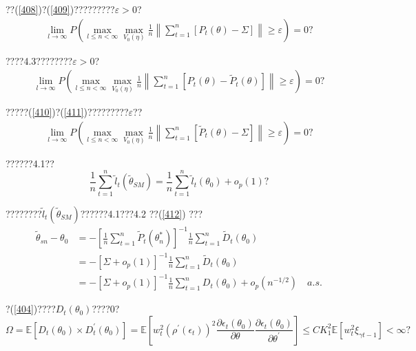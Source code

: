 \documentclass[a4paper,12pt,openany,oneside,utf-8]{ctexbook}
\begin{document}
	\noindent ??(\ref{408})?(\ref{409})?????????$\varepsilon>0$?
	\begin{align}\label{410}
		\lim _{l \rightarrow \infty} P\left(\max _{l \leq n<\infty} \max _{V_{0}(\eta)} \frac{1}{n}\left\|\sum_{t=1}^{n}\left[P_{t}(\theta)-\Sigma\right]\right\| \geq \varepsilon\right)=0\mbox{?}
	\end{align}
	
	\noindent ????4.3????????$\varepsilon>0$?
	\begin{align}\label{411}
		\lim _{l \rightarrow \infty} P\left(\max _{l \leq n<\infty} \max _{V_{0}(\eta)} \frac{1}{n}\left\|\sum_{t=1}^{n}\left[P_{t}(\theta)-\tilde{P}_{t}(\theta)\right]\right\| \geq \varepsilon\right)=0\mbox{?}
	\end{align}
	
	\noindent ?????(\ref{410})?(\ref{411})?????????$\varepsilon$??
	\begin{align}\label{412}
		\lim _{l \rightarrow \infty} P\left(\max _{l \leq n<\infty} \max _{V_{0}(\eta)} \frac{1}{n}\left\|\sum_{t=1}^{n}\left[\tilde{P}_{t}(\theta)-\Sigma\right]\right\| \geq \varepsilon\right)=0\mbox{?}
	\end{align}
	
	\noindent ??????4.1??
	$$\frac{1}{n}\sum_{t=1}^n\widetilde{l}_t(\tilde{\theta}_{SM})=\frac{1}{n}\sum_{t=1}^n\widetilde{l}_t(\theta_0)+o_p(1)\mbox{?}$$
	
	\noindent ????????$\widetilde{l}_t(\tilde{\theta}_{SM})$??????4.1???4.2 ??(\ref{412}) ???
	\begin{align}\label{413}
		\tilde{\theta}_{sn}-\theta_{0}&=-\left[\frac{1}{n} \sum_{t=1}^{n} \tilde{P}_{t}\left(\theta_{n}^{*}\right)\right]^{-1} \frac{1}{n} \sum_{t=1}^{n} \tilde{D}_{t}\left(\theta_{0}\right)\nonumber \\
		&=-[\Sigma+o_p(1)]^{-1} \frac{1}{n} \sum_{t=1}^{n} \tilde{D}_{t}\left(\theta_{0}\right)\nonumber \\
		&=-[\Sigma+o_p(1)]^{-1} \frac{1}{n} \sum_{t=1}^{n} D_{t}\left(\theta_{0}\right)+o_p\left(n^{-1 / 2}\right) \quad a.s.
	\end{align}
	
	\noindent ?(\ref{404})????$D_{t}(\theta_0)$????0?
	$$\Omega \!=\! \mathbb{E}\left[D_t(\theta_0)\times D_t^{\prime}(\theta_0)\right]\!=\!\mathbb{E}\left[w_t^2\left(\rho^{\prime}(\epsilon_t)\right)^2\frac{\partial \epsilon_{t}\left(\theta_0\right)}{\partial \theta} \frac{\partial \epsilon_{t}\left(\theta_0\right)}{\partial \theta^{\prime}}\right]\!\le\! CK_1^2\mathbb{E}\left[w_t^2\xi_{\gamma t-1}\right]\! < \!\infty\mbox{?}$$
	
\end{document}
